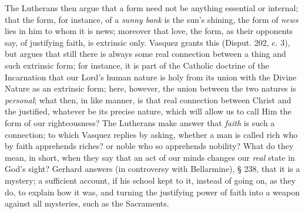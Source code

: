 The Lutherans then argue that a form need not be anything essential
or internal; that the form, for instance, of a \emph{sunny bank} is
the sun's shining, the form of \emph{news} lies in him to whom
it is news; moreover that love, the form, as their opponents say, of
justifying faith, is extrinsic only. Vasquez grants this (Disput. 202,
c. 3), but argues that still there is always some real connection
between a thing and such extrinsic form; for instance, it is part of
the Catholic doctrine of the Incarnation that our Lord's human nature
is holy from its union with the Divine Nature as an extrinsic form;
here, however, the union between the two natures is \emph{personal};
what then, in like manner, is that real connection between Christ and
the justified, whatever be its precise nature, which will allow us to
call Him the form of our righteousness? The Lutherans make answer that
\emph{faith} is such a connection; to which Vasquez replies by asking,
whether a man is called rich who by faith apprehends riches? or noble
who so apprehends nobility? What do they mean, in short, when they say
that an act of our minds changes our \emph{real} state in God's sight?
Gerhard answers (in controversy with Bellarmine), § 238, that it is a
mystery; a sufficient account, if his school kept to it, instead of
going on, as they do, to explain how it was, and turning the
justifying power of faith into a weapon against all mysteries, such as
the Sacraments.

